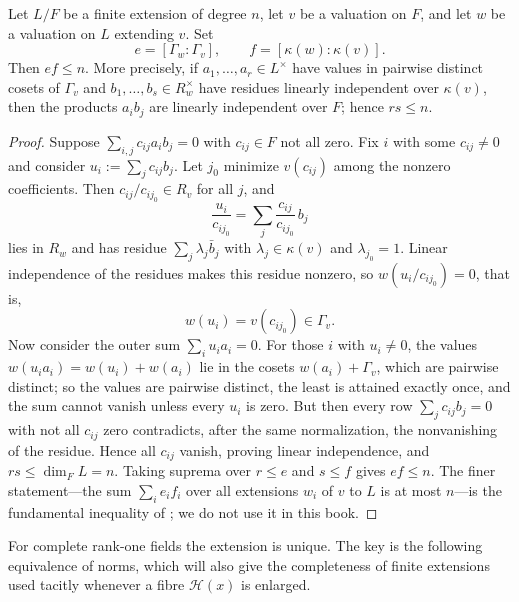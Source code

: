 \begin{proposition}
\label{prop:fundamental-inequality}
Let $L/F$ be a finite extension of degree $n$, let $v$ be a valuation on
$F$, and let $w$ be a valuation on $L$ extending $v$. Set
\[
 e=[\Gamma_w:\Gamma_v],
 \qquad
 f=[\kappa(w):\kappa(v)].
\]
Then $ef\leq n$. More precisely, if $a_1,\ldots,a_r\in L^\times$ have
values in pairwise distinct cosets of $\Gamma_v$ and
$b_1,\ldots,b_s\in R_w^\times$ have residues linearly independent over
$\kappa(v)$, then the products $a_ib_j$ are linearly independent over
$F$; hence $rs\leq n$.
\end{proposition}
\begin{proof}
Suppose $\sum_{i,j}c_{ij}a_ib_j=0$ with $c_{ij}\in F$ not all zero.
Fix $i$ with some $c_{ij}\neq0$ and consider
$u_i:=\sum_jc_{ij}b_j$. Let $j_0$ minimize $v(c_{ij})$ among the nonzero
coefficients. Then $c_{ij}/c_{ij_0}\in R_v$ for all $j$, and
\[
 \frac{u_i}{c_{ij_0}}=\sum_j\frac{c_{ij}}{c_{ij_0}}\,b_j
\]
lies in $R_w$ and has residue
$\sum_j\lambda_j\bar b_j$ with $\lambda_j\in\kappa(v)$ and
$\lambda_{j_0}=1$. Linear independence of the residues makes this residue
nonzero, so $w(u_i/c_{ij_0})=0$, that is,
\[
 w(u_i)=v(c_{ij_0})\in\Gamma_v .
\]
Now consider the outer sum $\sum_iu_ia_i=0$. For those $i$ with
$u_i\neq0$, the values
$w(u_ia_i)=w(u_i)+w(a_i)$ lie in the cosets $w(a_i)+\Gamma_v$, which are
pairwise distinct; so the values are pairwise distinct, the least is
attained exactly once, and the sum cannot vanish unless every $u_i$
is zero. But then every row
$\sum_jc_{ij}b_j=0$ with not all $c_{ij}$ zero contradicts, after the
same normalization, the nonvanishing of the residue. Hence all $c_{ij}$
vanish, proving linear independence, and $rs\leq\dim_FL=n$. Taking
suprema over $r\leq e$ and $s\leq f$ gives $ef\leq n$. The finer
statement---the sum $\sum_ie_if_i$ over all extensions $w_i$ of $v$ to
$L$ is at most $n$---is the fundamental inequality of
\cite[Chapter~VI, \S8]{AC}; we do not use it in this book.
\end{proof}

For complete rank-one fields the extension is unique. The key is the
following equivalence of norms, which will also give the completeness of
finite extensions used tacitly whenever a fibre $\mathcal H(x)$ is
enlarged.

